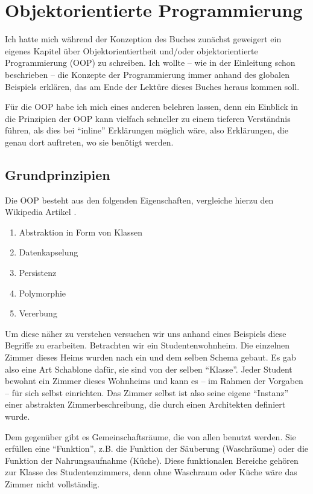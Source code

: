 
\chapter{Objektorientierte Programmierung}\label{chap:oop}

Ich hatte mich während der Konzeption des Buches zunächst geweigert ein eigenes Kapitel über Objektorientiertheit und/oder objektorientierte Programmierung (OOP) zu schreiben. Ich wollte -- wie in der Einleitung schon beschrieben -- die Konzepte der Programmierung immer anhand des globalen Beispiels erklären, das am Ende der Lektüre dieses Buches heraus kommen soll. 

Für die OOP habe ich mich eines anderen belehren lassen, denn ein Einblick in die Prinzipien der OOP kann vielfach schneller zu einem tieferen Verständnis führen, als dies bei "`inline"' Erklärungen möglich wäre, also Erklärungen, die genau dort auftreten, wo sie benötigt werden. 

\section{Grundprinzipien}

Die OOP besteht aus den folgenden Eigenschaften, vergleiche hierzu den Wikipedia Artikel \cite{wikioop}.

\begin{enumerate}
\item Abstraktion in Form von Klassen
\item Datenkapselung
\item Persistenz
\item Polymorphie 
\item Vererbung
\end{enumerate}

Um diese näher zu verstehen versuchen wir uns anhand eines Beispiels diese Begriffe zu erarbeiten. Betrachten wir ein Studentenwohnheim. Die einzelnen Zimmer dieses Heims wurden nach ein und dem selben Schema gebaut. Es gab also eine Art Schablone dafür, sie sind von der selben "`Klasse"'. Jeder Student bewohnt ein Zimmer dieses Wohnheims und kann es -- im Rahmen der Vorgaben -- für sich selbst einrichten. Das Zimmer selbst ist also seine eigene "`Instanz"' einer abstrakten Zimmerbeschreibung, die durch einen Architekten definiert wurde. 

Dem gegenüber gibt es Gemeinschaftsräume, die von allen benutzt werden. Sie erfüllen eine "`Funktion"', z.B. die Funktion der Säuberung (Waschräume) oder die Funktion der Nahrungsaufnahme (Küche). Diese funktionalen Bereiche gehören zur Klasse des Studentenzimmers, denn ohne Waschraum oder Küche wäre das Zimmer nicht vollständig. 

